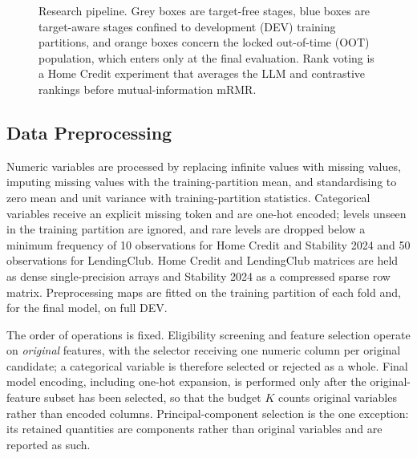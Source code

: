 \documentclass[preprint,12pt]{elsarticle}
\newcommand{\Kfeat}{K}
\begin{document}
\begin{figure}[htbp]
\caption{Research pipeline. Grey boxes are target-free stages, blue boxes are target-aware stages confined to development (DEV) training partitions, and orange boxes concern the locked out-of-time (OOT) population, which enters only at the final evaluation. Rank voting is a Home Credit experiment that averages the LLM and contrastive rankings before mutual-information mRMR.}
\label{fig:pipeline}
\end{figure}

\subsection{Data Preprocessing}
\label{subsec:preprocessing}

Numeric variables are processed by replacing infinite values with missing values, imputing missing values with the training-partition mean, and standardising to zero mean and unit variance with training-partition statistics. Categorical variables receive an explicit missing token and are one-hot encoded; levels unseen in the training partition are ignored, and rare levels are dropped below a minimum frequency of 10 observations for Home Credit and Stability 2024 and 50 observations for LendingClub. Home Credit and LendingClub matrices are held as dense single-precision arrays and Stability 2024 as a compressed sparse row matrix. Preprocessing maps are fitted on the training partition of each fold and, for the final model, on full DEV.

The order of operations is fixed. Eligibility screening and feature selection operate on \emph{original} features, with the selector receiving one numeric column per original candidate; a categorical variable is therefore selected or rejected as a whole. Final model encoding, including one-hot expansion, is performed only after the original-feature subset has been selected, so that the budget $\Kfeat$ counts original variables rather than encoded columns. Principal-component selection is the one exception: its retained quantities are components rather than original variables and are reported as such.
\end{document}
